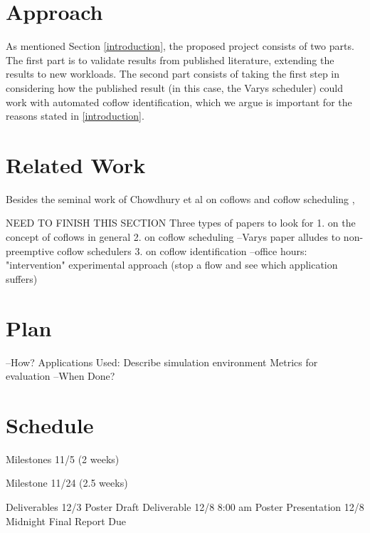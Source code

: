 \documentclass{article}
\begin{document}
\section{Approach}

As mentioned Section \ref{introduction}, the proposed project consists of two parts. The first part is to validate results from published literature, extending the results to new workloads. The second part consists of taking the first step in considering how the published result (in this case, the Varys scheduler) could work with automated coflow identification, which we argue is important for the reasons stated in \ref{introduction}.

\section{Related Work}

Besides the seminal work of Chowdhury et al on coflows and coflow scheduling \cite{chowdhury2012coflow, chowdhury2014varys, chowdhury2015aalo}, 

NEED TO FINISH THIS SECTION
Three types of papers to look for
1. on the concept of coflows in general
2. on coflow scheduling
--Varys paper alludes to non-preemptive coflow schedulers
3. on coflow identification
--office hours: "intervention" experimental approach (stop a flow and see which application suffers)

\section{Plan}

--How? 
Applications Used: Describe simulation environment
Metrics for evaluation
--When Done?

\section{Schedule}

Milestones 11/5 (2 weeks)

Milestone 11/24 (2.5 weeks)

Deliverables 12/3 Poster Draft
Deliverable 12/8 8:00 am Poster Presentation
12/8 Midnight Final Report Due

%
%



\end{document}
